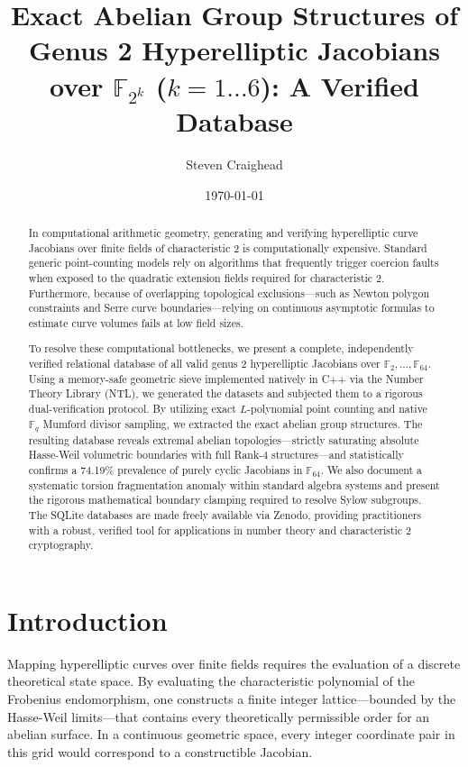 \documentclass[letterpaper, 11pt]{article}
\title{Exact Abelian Group Structures of Genus 2 Hyperelliptic Jacobians over \texorpdfstring{$\mathbb{F}_{2^k}$}{F\_2\textasciicircum k} (\texorpdfstring{$k=1 \dots 6$}{k=1..6}): A Verified Database}
\author{Steven Craighead}
\date{\today}
\begin{document}
\maketitle

\begin{abstract}
In computational arithmetic geometry, generating and verifying hyperelliptic curve Jacobians over finite fields of characteristic 2 is computationally expensive. Standard generic point-counting models rely on algorithms that frequently trigger coercion faults when exposed to the quadratic extension fields required for characteristic 2. Furthermore, because of overlapping topological exclusions—such as Newton polygon constraints and Serre curve boundaries—relying on continuous asymptotic formulas to estimate curve volumes fails at low field sizes. 

To resolve these computational bottlenecks, we present a complete, independently verified relational database of all valid genus 2 hyperelliptic Jacobians over $\mathbb{F}_2, \dots, \mathbb{F}_{64}$. Using a memory-safe geometric sieve implemented natively in C++ via the Number Theory Library (NTL), we generated the datasets and subjected them to a rigorous dual-verification protocol. By utilizing exact $L$-polynomial point counting and native $\mathbb{F}_q$ Mumford divisor sampling, we extracted the exact abelian group structures. The resulting database reveals extremal abelian topologies—strictly saturating absolute Hasse-Weil volumetric boundaries with full Rank-4 structures—and statistically confirms a 74.19\% prevalence of purely cyclic Jacobians in $\mathbb{F}_{64}$. We also document a systematic torsion fragmentation anomaly within standard algebra systems and present the rigorous mathematical boundary clamping required to resolve Sylow subgroups. The SQLite databases are made freely available via Zenodo, providing practitioners with a robust, verified tool for applications in number theory and characteristic 2 cryptography.
\end{abstract}

\section{Introduction}
Mapping hyperelliptic curves over finite fields requires the evaluation of a discrete theoretical state space. By evaluating the characteristic polynomial of the Frobenius endomorphism, one constructs a finite integer lattice—bounded by the Hasse-Weil limits—that contains every theoretically permissible order for an abelian surface. In a continuous geometric space, every integer coordinate pair in this grid would correspond to a constructible Jacobian.
\end{document}
